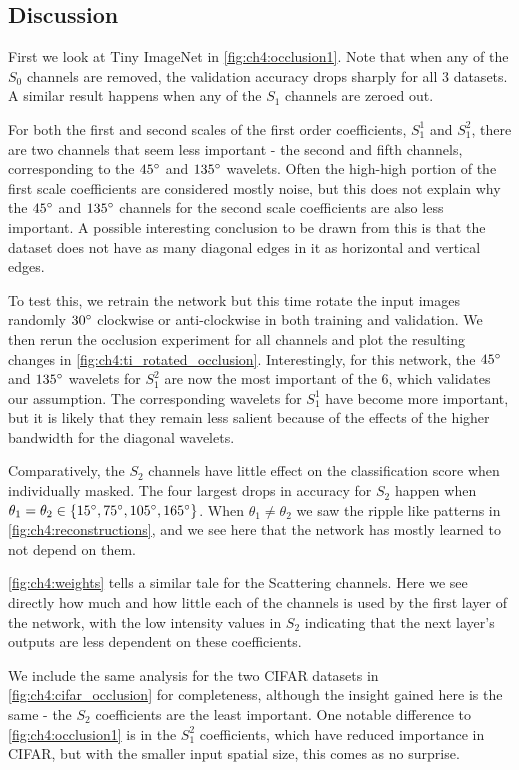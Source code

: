 \subsection{Discussion}
First we look at Tiny ImageNet in \autoref{fig:ch4:occlusion1}.
Note that when any of the $S_0$ channels are removed, 
the validation accuracy drops sharply for all 3 datasets. A similar result
happens when any of the $S_1$ channels are zeroed out. 

For both the first and second scales of the first order coefficients, 
$S_1^1$ and $S_1^2$, there are two channels that seem less
important - the second and fifth channels, corresponding to the $45^{\circ}$ and
$135^{\circ}$ wavelets. Often the high-high portion of the first scale coefficients
are considered mostly noise, but this does not explain why the $45^{\circ}$
and $135^{\circ}$ channels for the second scale coefficients are also less
important. A possible interesting conclusion to be drawn from this is that the
dataset does not have as many diagonal edges in it as horizontal and vertical
edges. 

To test this, we retrain the network but this time rotate the input
images randomly $30^{\circ}$ clockwise or anti-clockwise in both training and
validation. We then rerun the occlusion experiment for all channels and plot the
resulting changes in \autoref{fig:ch4:ti_rotated_occlusion}. Interestingly, for
this network, the $45^{\circ}$ and $135^{\circ}$ wavelets for $S_1^2$ are now the most
important of the 6, which validates our assumption. The corresponding wavelets
for $S_1^1$ have become more important, but it is likely that they remain less
salient because of the effects of the higher bandwidth for the diagonal
wavelets.

Comparatively, the $S_2$ channels have little effect on the classification score
when individually masked. The four largest drops in accuracy for
$S_2$ happen when $\theta_1 = \theta_2 \in \{15^{\circ}, 75^{\circ}, 105^{\circ}, 165^{\circ}\}$.
When $\theta_1 \neq \theta_2$ we saw the ripple like patterns in
\autoref{fig:ch4:reconstructions}, and we see here that the network has mostly
learned to not depend on them.

\autoref{fig:ch4:weights} tells a similar tale for the Scattering channels. Here
we see directly how much and how little each of the channels is used by the
first layer of the network, with the low intensity values in $S_2$ indicating that the
next layer's outputs are less dependent on these coefficients.

We include the same analysis for the two CIFAR datasets in
\autoref{fig:ch4:cifar_occlusion} for completeness, although the insight gained
here is the same - the $S_2$ coefficients are the least important. One notable difference to
\autoref{fig:ch4:occlusion1} is in the $S_1^2$ coefficients, which have reduced importance 
in CIFAR, but with the smaller input spatial size, this comes as no surprise.

